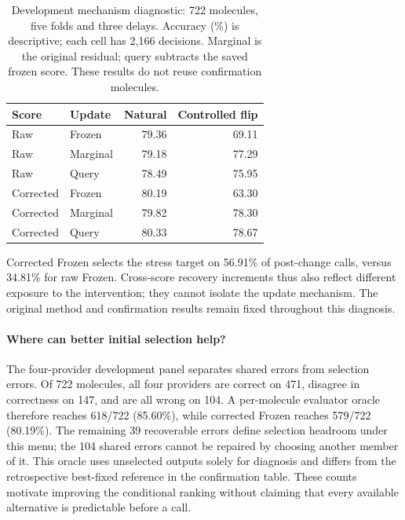 \documentclass[sigconf,anonymous]{aamas}
\begin{document}
\begin{table}[t]
\caption{Development mechanism diagnostic: 722 molecules, five folds and three delays. Accuracy (\%) is descriptive; each cell has 2,166 decisions. Marginal is the original residual; query subtracts the saved frozen score. These results do not reuse confirmation molecules.}
\label{tab:centering-diagnostic}
\centering
\small
\begin{tabular}{@{}llrr@{}}
\toprule
Score & Update & Natural & Controlled flip \\
\midrule
Raw & Frozen & 79.36 & 69.11 \\
Raw & Marginal & 79.18 & 77.29 \\
Raw & Query & 78.49 & 75.95 \\
\midrule
Corrected & Frozen & 80.19 & 63.30 \\
Corrected & Marginal & 79.82 & 78.30 \\
Corrected & Query & 80.33 & 78.67 \\
\bottomrule
\end{tabular}
\end{table}

Corrected Frozen selects the stress target on 56.91\% of post-change calls, versus 34.81\% for raw Frozen. Cross-score recovery increments thus also reflect different exposure to the intervention; they cannot isolate the update mechanism. The original method and confirmation results remain fixed throughout this diagnosis.


\paragraph{Where can better initial selection help?}
The four-provider development panel separates shared errors from selection errors. Of 722 molecules, all four providers are correct on 471, disagree in correctness on 147, and are all wrong on 104. A per-molecule evaluator oracle therefore reaches 618/722 (85.60\%), while corrected Frozen reaches 579/722 (80.19\%). The remaining 39 recoverable errors define selection headroom under this menu; the 104 shared errors cannot be repaired by choosing another member of it. This oracle uses unselected outputs solely for diagnosis and differs from the retrospective best-fixed reference in the confirmation table. These counts motivate improving the conditional ranking without claiming that every available alternative is predictable before a call.
\end{document}
